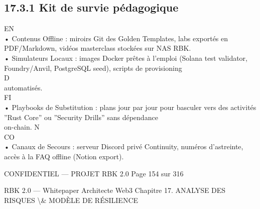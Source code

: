 \subsection{17.3.1 Kit de survie pédagogique}
\vspace{0.5em}
\vspace{0.5em}
\vspace{0.5em}
\vspace{0.5em}
EN\\
• Contenus Offline : miroirs Git des Golden Templates, labs exportés en PDF/Markdown, vidéos masterclass stockées sur NAS RBK.\\
\vspace{0.5em}
• Simulateurs Locaux : images Docker prêtes à l’emploi (Solana test validator, Foundry/Anvil, PostgreSQL seed), scripts de provisioning\\
\vspace{0.5em}
\vspace{0.5em}
\vspace{0.5em}
\vspace{0.5em}
D\\
automatisés.\\
\vspace{0.5em}
\vspace{0.5em}
\vspace{0.5em}
\vspace{0.5em}
FI\\
• Playbooks de Substitution : plans jour par jour pour basculer vers des activités ”Rust Core” ou ”Security Drills” sans dépendance\\
on-chain.                                      N\\
CO\\
• Canaux de Secours : serveur Discord privé Continuity, numéros d’astreinte, accès à la FAQ offline (Notion export).\\
\vspace{0.5em}
\vspace{0.5em}
\vspace{0.5em}
\vspace{0.5em}
\begin{confidential}CONFIDENTIEL — PROJET RBK 2.0                                Page 154 sur 316\end{confidential}
RBK 2.0 — Whitepaper Architecte Web3                                            Chapitre 17. ANALYSE DES RISQUES \textbackslash{}& MODÈLE DE RÉSILIENCE\\
\vspace{0.5em}
\vspace{0.5em}
